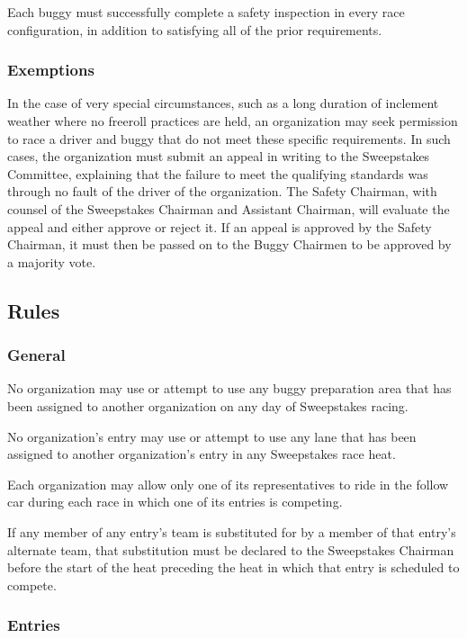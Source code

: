	Each buggy must successfully complete a safety inspection in every race
	configuration, in addition to satisfying all of the prior requirements.

\subsubsection{Exemptions}

	In the case of very special circumstances, such as a long duration of inclement
	weather where no freeroll practices are held, an organization may seek
	permission to race a driver and buggy that do not meet these specific
	requirements. In such cases, the organization must submit an appeal in writing
	to the Sweepstakes Committee, explaining that the failure to meet the
	qualifying standards was through no fault of the driver of the organization.
	The Safety Chairman, with counsel of the Sweepstakes Chairman and Assistant
	Chairman, will evaluate the appeal and either approve or reject it. If an
	appeal is approved by the Safety Chairman, it must then be passed on to the
	Buggy Chairmen to be approved by a majority vote.
	
\subsection{Rules}

\subsubsection{General}

	No organization may use or attempt to use any buggy preparation area that has
	been assigned to another organization on any day of Sweepstakes racing.

	No organization's entry may use or attempt to use any lane that has been
	assigned to another organization's entry in any Sweepstakes race heat.

	Each organization may allow only one of its representatives to ride in the
	follow car during each race in which one of its entries is competing.

	If any member of any entry's team is substituted for by a member of that
	entry's alternate team, that substitution must be declared to the Sweepstakes
	Chairman before the start of the heat preceding the heat in which that entry is
	scheduled to compete.

\subsubsection{Entries}


